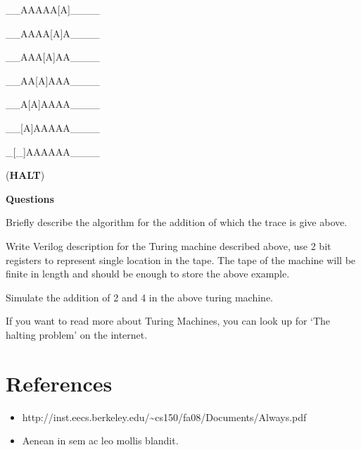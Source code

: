 \documentclass[a4paper,10pt]{article}
\theoremstyle{mytheor}
\begin{document}
{\begin{legal}
    \item \begin{textsc}\_\_AAAAA[A]\_\_\_\_\end{textsc}
    \item \begin{textsc}\_\_AAAA[A]A\_\_\_\_\end{textsc}
    \item \begin{textsc}\_\_AAA[A]AA\_\_\_\_\end{textsc}
    \item \begin{textsc}\_\_AA[A]AAA\_\_\_\_\end{textsc}
    \item \begin{textsc}\_\_A[A]AAAA\_\_\_\_\end{textsc}
    \item \begin{textsc}\_\_[A]AAAAA\_\_\_\_\end{textsc}
    \item \begin{textsc}\_[\_]AAAAAA\_\_\_\_\end{textsc} (\textbf{HALT})
    \end{legal}

    \textbf{Questions}
    \begin{legal}
    \item Briefly describe the algorithm for the addition of which the
      trace is give above.
    \item Write Verilog description for the Turing machine described
      above, use 2 bit registers to represent single location in the
      tape. The tape of the machine will be finite in length and
      should be enough to store the above example.
    \item Simulate the addition of 2 and 4 in the above turing
      machine.
    \end{legal}
  If you want to read more about Turing Machines, you can look up for
  `The halting problem' on the internet.
  
 }

 \pagebreak
\section*{References}
\begin{itemize}
  \small
\item
  http://inst.eecs.berkeley.edu/{\textasciitilde}cs150/fa08/Documents/Always.pdf
\item Aenean in sem ac leo mollis blandit.
\end{itemize}
\end{document}
